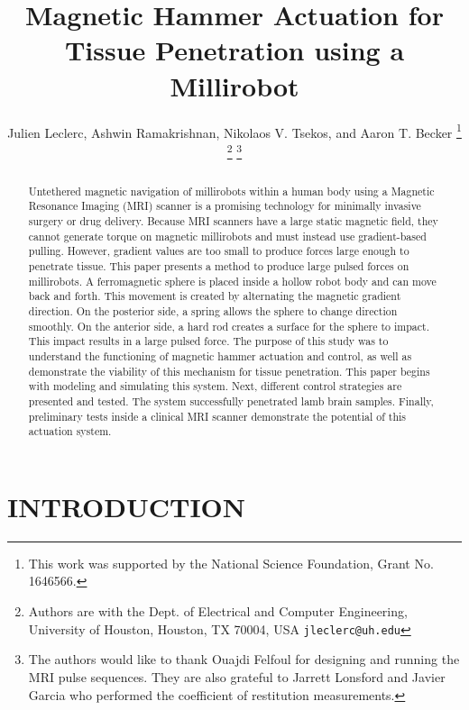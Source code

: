 \documentclass[letterpaper, 10 pt, conference]{ieeeconf}  %
\title{\LARGE \bf
Magnetic Hammer Actuation for Tissue Penetration using a Millirobot}
\author{Julien Leclerc, Ashwin Ramakrishnan, Nikolaos V. Tsekos, and Aaron T. Becker %
\thanks{This work was supported by the National Science Foundation, Grant No. 1646566. }%
\thanks{Authors are with the Dept. of Electrical and Computer
Engineering, University of Houston, Houston, TX 70004, USA
        {\tt\small jleclerc@uh.edu}}%
\thanks{The authors would like to thank Ouajdi Felfoul for designing and running the MRI pulse sequences. They are also grateful to Jarrett Lonsford and Javier Garcia who performed the coefficient of restitution measurements.}
}
\begin{document}
\maketitle
\thispagestyle{empty}
\pagestyle{empty}


\begin{abstract}

Untethered magnetic navigation of millirobots within a human body using a Magnetic Resonance Imaging (MRI) scanner is a promising technology for minimally invasive surgery or drug delivery.
Because MRI scanners have a large static magnetic field, they cannot generate torque on magnetic millirobots and must instead use gradient-based pulling.
 However, gradient values are too small to produce forces large enough to penetrate tissue. 
 This paper presents a method to produce large pulsed forces on millirobots. 
 A ferromagnetic sphere is placed inside a hollow robot body and can move back and forth. 
 This movement is created by alternating the magnetic gradient direction. 
 On the posterior side, a spring allows the sphere to change direction smoothly. 
 On the anterior side, a hard rod creates a surface for the sphere to impact. 
 This impact results in a large pulsed force. 
 The purpose of this study was to understand the functioning of magnetic hammer actuation and control, as well as demonstrate the viability of this mechanism for tissue penetration.
 This paper begins with modeling and simulating this system. 
 Next, different control strategies are presented and tested. The system successfully penetrated lamb brain samples.
  Finally, preliminary tests inside a clinical MRI scanner demonstrate the potential of this actuation system. 

\end{abstract}


\section{INTRODUCTION}
\end{document}

